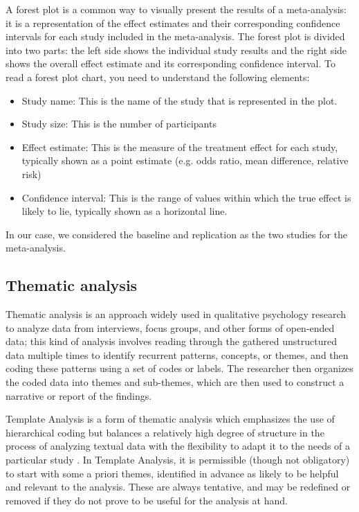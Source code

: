 A forest plot is a common way to visually present the results of a meta-analysis: it is a representation of the effect estimates and their corresponding confidence intervals for each study included in the meta-analysis. The forest plot is divided into two parts: the left side shows the individual study results and the right side shows the overall effect estimate and its corresponding confidence interval.
To read a forest plot chart, you need to understand the following elements:
\begin{itemize}
    \item Study name: This is the name of the study that is represented in the plot.
    \item Study size: This is the number of participants
    \item Effect estimate: This is the measure of the treatment effect for each study, typically shown as a point estimate (e.g. odds ratio, mean difference, relative risk)
    \item Confidence interval: This is the range of values within which the true effect is likely to lie, typically shown as a horizontal line.
\end{itemize}

In our case, we considered the baseline and replication as the two studies for the meta-analysis.
    

\subsection{Thematic analysis}
Thematic analysis is an approach widely used in qualitative psychology research to analyze data from interviews, focus groups, and other forms of open-ended data; this kind of analysis involves reading through the gathered unstructured data multiple times to identify recurrent patterns, concepts, or themes, and then coding these patterns using a set of codes or labels. The researcher then organizes the coded data into themes and sub-themes, which are then used to construct a narrative or report of the findings.

Template Analysis is a form of thematic analysis which emphasizes the use of hierarchical coding but balances a relatively high degree of structure in the process of analyzing textual data with the flexibility to adapt it to the needs of a particular study \cite{ThematicAnalysis}. In Template Analysis, it is permissible (though not obligatory) to start with some a priori themes, identified in advance as likely to be helpful and relevant to the analysis. These are always tentative, and may be redefined or removed if they do not prove to be useful for the analysis at hand.

